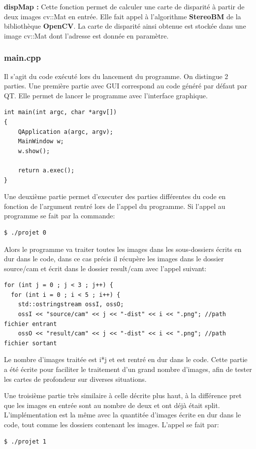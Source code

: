 \documentclass[a4paper]{article}
\begin{document}
\textbf{dispMap :} Cette fonction permet de calculer une carte de disparité à
partir de deux images cv::Mat en entrée. Elle fait appel à l'algorithme
\textbf{StereoBM} de la bibliothèque \textbf{OpenCV}. La carte de disparité ainsi
obtenue est stockée dans une image cv::Mat dont l'adresse est donnée en paramètre.

\subsubsection*{main.cpp}

Il s'agit du code exécuté lors du lancement du programme. On distingue 2 parties.
Une première partie avec GUI correspond au code généré par défaut par QT.
Elle permet de lancer le programme avec l'interface graphique.

\begin{verbatim}
int main(int argc, char *argv[])
{
	QApplication a(argc, argv);
	MainWindow w;
	w.show();

	return a.exec();
}
\end{verbatim}

Une deuxième partie permet d'executer des parties différentes du code en fonction de l'argument rentré lors de l'appel du programme. Si l'appel au programme se fait par la commande:
\begin{verbatim}
$ ./projet 0
\end{verbatim}
Alors le programme va traiter toutes les images dans les sous-dossiers écrits en dur dans le code, dans ce cas précis il récupère les images dans le dossier source/cam et écrit dans le dossier result/cam avec l'appel suivant:
\begin{verbatim}
for (int j = 0 ; j < 3 ; j++) {
  for (int i = 0 ; i < 5 ; i++) {
    std::ostringstream ossI, ossO;
    ossI << "source/cam" << j << "-dist" << i << ".png"; //path fichier entrant
    ossO << "result/cam" << j << "-dist" << i << ".png"; //path fichier sortant
\end{verbatim}
Le nombre d'images traitée est i*j et est rentré en dur dans le code. Cette partie a été écrite pour faciliter le traitement d'un grand nombre d'images, afin de tester les cartes de profondeur sur diverses situations.

Une troisième partie très similaire à celle décrite plus haut, à la différence pret que les images en entrée sont au nombre de deux et ont déjà était split. L'implémentation est la même avec la quantitée d'images écrite en dur dans le code, tout comme les dossiers contenant les images. L'appel se fait par:
\begin{verbatim}
$ ./projet 1
\end{verbatim}
\end{document}

